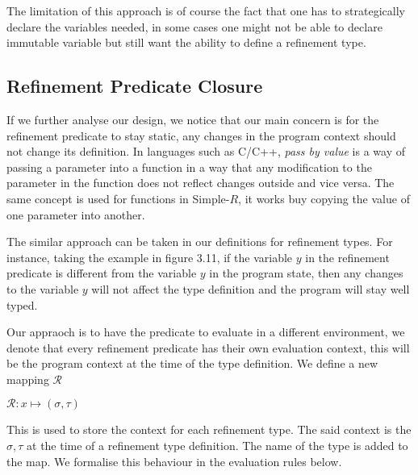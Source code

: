 \documentclass[a4paper,12pt]{report}
\begin{document}
\par
The limitation of this approach is of course the fact that one has to strategically 
declare the variables needed, in some cases one might not be able to declare 
immutable variable but still want the ability to define a refinement type.

\subsection{Refinement Predicate Closure}
If we further analyse our design, we notice that our main concern is for the 
refinement predicate to stay static, any changes in the program context should 
not change its definition. In languages such as C/C++, \textit{pass by value} 
\cite{pbv} is a way of passing a parameter into a function in a 
way that any modification to the parameter in the function 
does not reflect changes outside and vice versa. The 
same concept is used for functions in Simple-$R$, it works buy copying the value 
of one parameter into another.

\par
The similar approach can be taken in our definitions for refinement types. For 
instance, taking the example in figure 3.11, if the variable $y$ in the refinement  
predicate is different from the variable $y$ in the program state, then any 
changes to the variable $y$ will not affect the type definition and the program 
will stay well typed.

\par
Our appraoch is to have the predicate to evaluate in a different environment, we 
denote that every refinement predicate has their own evaluation context, this 
will be the program context at the time of the type definition. We define a new 
mapping $\mathcal{R}$

\begin{center}
  $\mathcal{R}: x \mapsto (\sigma, \tau)$   
\end{center}

This is used to store the context for each refinement type. The said context is 
the $\sigma, \tau$ at the time of a refinement type definition.
The name of the type is added to the map. 
We formalise this behaviour in the evaluation rules below.
\end{document}
